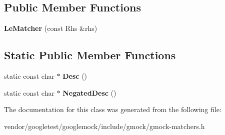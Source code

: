 \subsection*{Public Member Functions}
\begin{DoxyCompactItemize}
\item 
\mbox{\label{classtesting_1_1internal_1_1_le_matcher_ae3dce3765263397fa5de202d45d0bdb5}} 
{\bfseries Le\+Matcher} (const Rhs \&rhs)
\end{DoxyCompactItemize}
\subsection*{Static Public Member Functions}
\begin{DoxyCompactItemize}
\item 
\mbox{\label{classtesting_1_1internal_1_1_le_matcher_adfef0084cb0f28503a40d7157699519b}} 
static const char $\ast$ {\bfseries Desc} ()
\item 
\mbox{\label{classtesting_1_1internal_1_1_le_matcher_a01dada192b6f7139b66bbc198b3cb03b}} 
static const char $\ast$ {\bfseries Negated\+Desc} ()
\end{DoxyCompactItemize}


The documentation for this class was generated from the following file\+:\begin{DoxyCompactItemize}
\item 
vendor/googletest/googlemock/include/gmock/gmock-\/matchers.\+h\end{DoxyCompactItemize}
